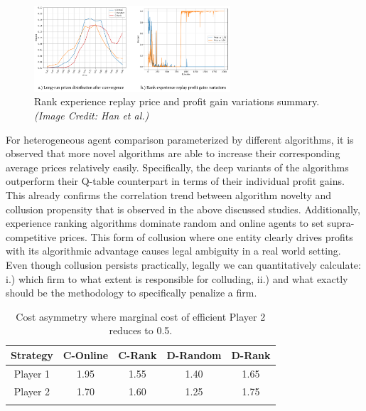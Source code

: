 \documentclass{article}
\begin{document}
\begin{figure}[h]
    \centering
    \includegraphics[width=0.65\textwidth]{study-three/rank-replay-experience-experiments.png}
    \caption{Rank experience replay price and profit gain variations summary. \textit{(Image Credit: Han et al.)}}
    \label{fig:rank-replay-experiments}
\end{figure}


For heterogeneous agent comparison parameterized by different algorithms, it is observed that more novel algorithms are able to increase their corresponding average prices relatively easily.
Specifically, the deep variants of the algorithms outperform their Q-table counterpart in terms of their individual profit gains.
This already confirms the correlation trend between algorithm novelty and collusion propensity that is observed in the above discussed studies.
Additionally, experience ranking algorithms dominate random and online agents to set supra-competitive prices.
This form of collusion where one entity clearly drives profits with its algorithmic advantage causes legal ambiguity in a real world setting.
Even though collusion persists practically, legally we can quantitatively calculate: i.) which firm to what extent is responsible for colluding, ii.) and what exactly should be the methodology to specifically penalize a firm.


\begin{table}[t]
\centering
\caption{Cost asymmetry where marginal cost of efficient Player 2 reduces to 0.5.}
     \label{table_firm_asymmetry}
    \begin{center}
        \begin{tabular}{ccccc}
        \toprule
            Strategy & C-Online & C-Rank & D-Random & D-Rank \\
        \midrule 
             Player 1 & 1.95 & 1.55 & 1.40 & 1.65 \\
             Player 2 & 1.70 & 1.60 & 1.25 & 1.75 \\
        \bottomrule
        \\
       \end{tabular}
     \end{center}
\end{table}
\end{document}
